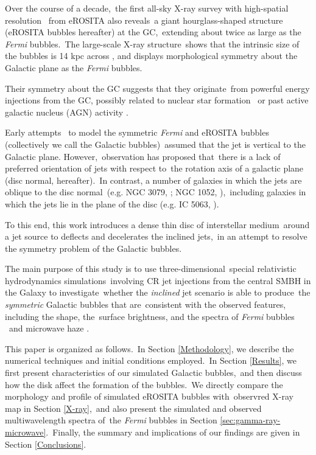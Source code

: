 \documentclass[twocolumn]{aastex631}
\begin{document}
Over the course of a decade,\
the first all-sky X-ray survey with high-spatial resolution \citep{Predehl2021}\
from eROSITA \citep{Predehl2020} also reveals\
a giant hourglass-shaped structure (eROSITA bubbles hereafter) at the GC,\
extending about twice as large as the \textit{Fermi} bubbles.\
The large-scale X-ray structure\
shows that the intrinsic size of the bubbles is 14 kpc across \citep{Predehl2021},
and displays morphological symmetry about the Galactic plane as the \textit{Fermi} bubbles.

Their symmetry about the GC suggests that they originate\
from powerful energy injections from the GC, possibly related to nuclear star formation\
\citep{PhysRevLett.106.101102,Carretti2013}
or past active galactic nucleus (AGN) activity \citep{Guo2012,Yang2017}.

Early attempts \citep{Sarkar2015,Yang2017,Zhang2020}\
to model the symmetric \textit{Fermi} and eROSITA bubbles (collectively we call the Galactic bubbles)\
assumed that the jet is vertical to the Galactic plane. However,\
observation \citep{Gallimore2006} has proposed that\
there is a lack of preferred orientation of jets with respect to\
the rotation axis of a galactic plane (disc normal, hereafter).\
In contrast, a number of galaxies in which the jets are oblique to the disc normal\
(e.g. NGC 3079, \citealt{Cecil2001}; NGC 1052, \citealt{Dopita2015}),\
including galaxies in which the jets lie in the plane of the disc (e.g. IC 5063, \citealt{Morganti2015}).

To this end, this work introduces a dense thin disc of interstellar medium\
around a jet source to deflects and decelerates the inclined jets,\
in an attempt to resolve the symmetry problem of the Galactic bubbles.\

The main purpose of this study is to use three-dimensional\
special relativistic hydrodynamics simulations\
involving CR jet injections from the central SMBH in the Galaxy to investigate\
whether the \textit{inclined} jet scenario is able to produce\
the \textit{symmetric} Galactic bubbles that are\
consistent with the observed features, including the shape, the\
surface brightness, and the spectra of \textit{Fermi} bubbles \citep{Ackermann2014}\
and microwave haze \citep{Dobler_2008,PlanckCollaborationIX2013}.

This paper is organized as follows.\
In Section \ref{Methodology}, we describe the numerical techniques and initial conditions employed.\
In Section \ref{Results}, we first present characteristics of our simulated Galactic bubbles,\
and then discuss how the disk affect the formation of the bubbles.\
We directly compare the morphology and profile of simulated eROSITA bubbles with\
observred X-ray map in Section \ref{X-ray},\
and also present the simulated and observed multiwavelength spectra of\
the \textit{Fermi} bubbles in Section \ref{sec:gamma-ray-microwave}.\
Finally, the summary and implications of our findings are given in Section \ref{Conclusions}.
\end{document}
